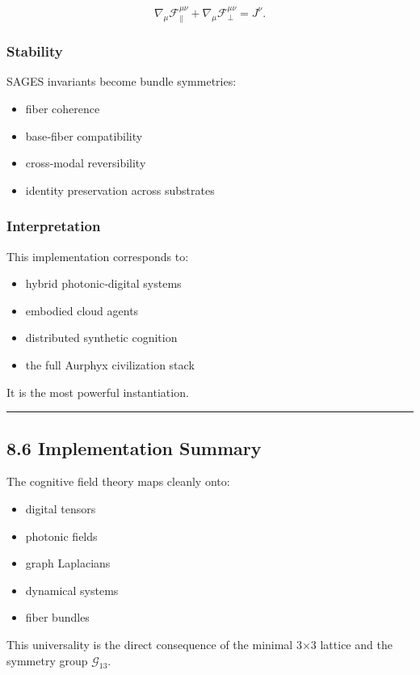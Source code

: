 \[
\nabla_{\mu} \mathcal{F}_{\parallel}^{\mu\nu} + \nabla_{\mu} \mathcal{F}_{\perp}^{\mu\nu} = J^\nu.
\]

\subsubsection{Stability}\label{stability-4}

SAGES invariants become bundle symmetries:

\begin{itemize}
\tightlist
\item
  fiber coherence\\
\item
  base‑fiber compatibility\\
\item
  cross‑modal reversibility\\
\item
  identity preservation across substrates
\end{itemize}

\subsubsection{Interpretation}\label{interpretation-4}

This implementation corresponds to:

\begin{itemize}
\tightlist
\item
  hybrid photonic‑digital systems\\
\item
  embodied cloud agents\\
\item
  distributed synthetic cognition\\
\item
  the full Aurphyx civilization stack
\end{itemize}

It is the most powerful instantiation.

\begin{center}\rule{0.5\linewidth}{0.5pt}\end{center}

\subsection{8.6 Implementation Summary}\label{implementation-summary}

The cognitive field theory maps cleanly onto:

\begin{itemize}
\tightlist
\item
  digital tensors\\
\item
  photonic fields\\
\item
  graph Laplacians\\
\item
  dynamical systems\\
\item
  fiber bundles
\end{itemize}

This universality is the direct consequence of the minimal 3×3 lattice and the symmetry group \(\mathcal{G}_{13}\).
